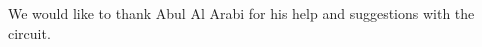 \documentclass[manuscript, screen, sigconf]{acmart}
\begin{document}

\maketitle



% 



%




\begin{acks}
We would like to thank Abul Al Arabi for his help and suggestions with the circuit.
\end{acks}






\end{document}
